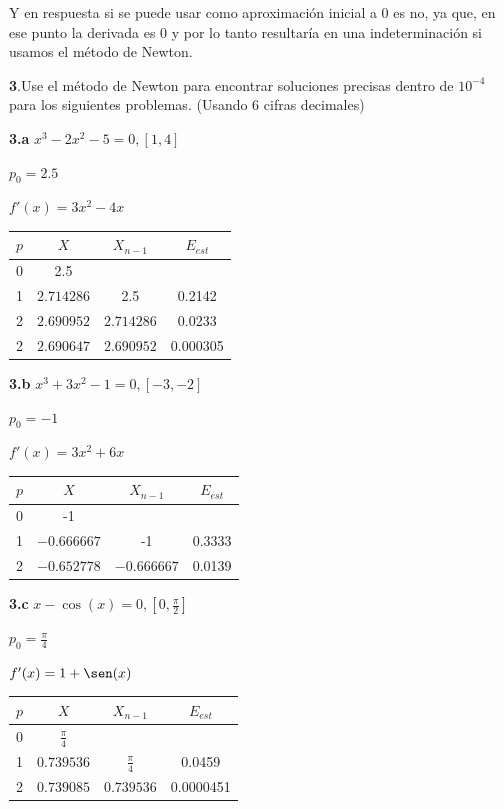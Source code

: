 \documentclass[12pt]{article}
\begin{document}
Y en respuesta si se puede usar como aproximación inicial a 0 es no, ya que, en ese punto la derivada es 0 y por lo tanto resultaría en una indeterminación si usamos el método de Newton.

\textbf{3}.Use el método de Newton para encontrar soluciones precisas dentro de $10^{-4}$ para los siguientes problemas.
(Usando 6 cifras decimales)

\textbf{3.a} $x^3 - 2x^2 - 5 = 0, [1,4]$ 

$p_0 = 2.5$

$f'(x) = 3x^2 -4x$

\begin{center}
    \begin{tabular}{|c|c|c|c|}
        \hline
        $p$&$X$&$X_{n-1}$&$E_{est}$\\
        \hline
        0 & 2.5&  & \\
        1 &$2.714286$&2.5&0.2142\\
        2 &$2.690952$&$2.714286$&0.0233\\
        2 &$2.690647$&$2.690952$&0.000305\\
        \hline
      \end{tabular} 
\end{center}



\textbf{3.b} $x^3 + 3x^2 - 1 = 0, [-3, -2]$ 

$p_0 = -1$

$f'(x) = 3x^2 +6x$

\begin{center}
    \begin{tabular}{|c|c|c|c|}
        \hline
        $p$&$X$&$X_{n-1}$&$E_{est}$\\
        \hline
        0 & -1&  & \\
        1 &$-0.666667$&-1&0.3333\\
        2 &$-0.652778$&$-0.666667$&0.0139\\
        \hline
      \end{tabular} 
\end{center}

\textbf{3.c} $x - \cos(x)=0, [0, \frac{\pi}{2}]$ 

$p_0 = \frac{\pi}{4}$

$f'(x) = 1 + \sen(x)$

\begin{center}
    \begin{tabular}{|c|c|c|c|}
        \hline
        $p$&$X$&$X_{n-1}$&$E_{est}$\\
        \hline
        0 & $\frac{\pi}{4}$&  & \\
        1 &$0.739536$&$\frac{\pi}{4}$&0.0459\\
        2 &$0.739085$&$0.739536$&0.0000451\\
        \hline
      \end{tabular} 
\end{center}
\end{document}
